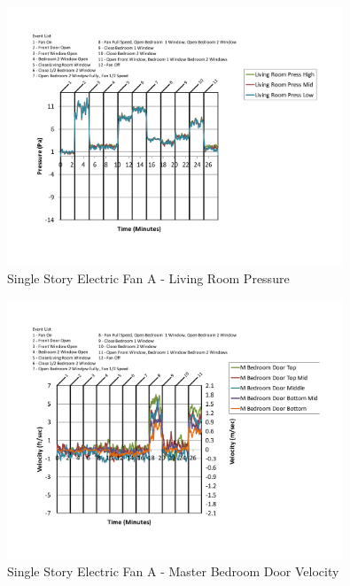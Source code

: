 \documentclass{article}
\begin{document}
\begin{appendices}
	\begin{figure}[H]
		\centering
		\includegraphics[height=3.05in,trim=0.67in 1.1in 0.67in 0.8in,clip=true]{0_Images/Results_Charts/ColdFlow/Single_Story/Electric/A/Living_Room_Pressure.pdf}
		\caption{Single Story Electric Fan A - Living Room Pressure}
	\end{figure}
 

	\begin{figure}[H]
		\centering
		\includegraphics[height=3.05in,trim=0.67in 1.1in 0.67in 0.8in,clip=true]{0_Images/Results_Charts/ColdFlow/Single_Story/Electric/A/Master_Bedroom_Door_Velocity.pdf}
		\caption{Single Story Electric Fan A - Master Bedroom Door Velocity}
	\end{figure}
 
	\clearpage


\end{appendices}
\end{document}
